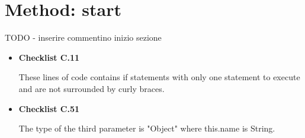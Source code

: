 \documentclass[../../../../codeInspection.tex]{subfiles}
\begin{document}
	\section{Method: start}

		TODO - inserire commentino inizio sezione

		\begin{itemize}

			\item \textbf{Checklist C.11}

				  

				  

				  These lines of code contains if statements with only one statement to execute and are not surrounded by curly braces.

			\item \textbf{Checklist C.51}

				  

				  The type of the third parameter is "Object" where this.name is String.

		\end{itemize}
\end{document}
